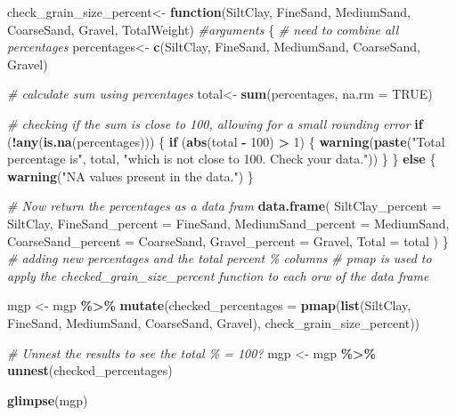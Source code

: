\documentclass[
]{article}
\newenvironment{Shaded}{\begin{snugshade}}{\end{snugshade}}
\newcommand{\AttributeTok}[1]{\textcolor[rgb]{0.13,0.29,0.53}{#1}}
\newcommand{\CommentTok}[1]{\textcolor[rgb]{0.56,0.35,0.01}{\textit{#1}}}
\newcommand{\ConstantTok}[1]{\textcolor[rgb]{0.56,0.35,0.01}{#1}}
\newcommand{\ControlFlowTok}[1]{\textcolor[rgb]{0.13,0.29,0.53}{\textbf{#1}}}
\newcommand{\DecValTok}[1]{\textcolor[rgb]{0.00,0.00,0.81}{#1}}
\newcommand{\FunctionTok}[1]{\textcolor[rgb]{0.13,0.29,0.53}{\textbf{#1}}}
\newcommand{\NormalTok}[1]{#1}
\newcommand{\OtherTok}[1]{\textcolor[rgb]{0.56,0.35,0.01}{#1}}
\newcommand{\SpecialCharTok}[1]{\textcolor[rgb]{0.81,0.36,0.00}{\textbf{#1}}}
\newcommand{\StringTok}[1]{\textcolor[rgb]{0.31,0.60,0.02}{#1}}
\begin{document}
\begin{Shaded}
\begin{Highlighting}[]
\NormalTok{check\_grain\_size\_percent}\OtherTok{\textless{}{-}} \ControlFlowTok{function}\NormalTok{(SiltClay, FineSand, MediumSand, CoarseSand, Gravel, TotalWeight) }\CommentTok{\#arguments }
\NormalTok{\{ }\CommentTok{\# need to combine all percentages}
\NormalTok{  percentages}\OtherTok{\textless{}{-}} \FunctionTok{c}\NormalTok{(SiltClay, FineSand, MediumSand, CoarseSand, Gravel)}
  
  \CommentTok{\# calculate sum using percentages}
\NormalTok{  total}\OtherTok{\textless{}{-}} \FunctionTok{sum}\NormalTok{(percentages, }\AttributeTok{na.rm =} \ConstantTok{TRUE}\NormalTok{)}
  
  \CommentTok{\# checking if the sum is close to 100, allowing for a small rounding error}
   \ControlFlowTok{if}\NormalTok{ (}\SpecialCharTok{!}\FunctionTok{any}\NormalTok{(}\FunctionTok{is.na}\NormalTok{(percentages))) \{}
    \ControlFlowTok{if}\NormalTok{ (}\FunctionTok{abs}\NormalTok{(total }\SpecialCharTok{{-}} \DecValTok{100}\NormalTok{) }\SpecialCharTok{\textgreater{}} \DecValTok{1}\NormalTok{) \{}
      \FunctionTok{warning}\NormalTok{(}\FunctionTok{paste}\NormalTok{(}\StringTok{"Total percentage is"}\NormalTok{, total, }\StringTok{"which is not close to 100. Check your data."}\NormalTok{))}
\NormalTok{    \}}
\NormalTok{  \} }\ControlFlowTok{else}\NormalTok{ \{}
    \FunctionTok{warning}\NormalTok{(}\StringTok{"NA values present in the data."}\NormalTok{)}
\NormalTok{  \}}
  
  \CommentTok{\# Now return the percentages as a data fram}
  \FunctionTok{data.frame}\NormalTok{(}
    \AttributeTok{SiltClay\_percent =}\NormalTok{ SiltClay,}
    \AttributeTok{FineSand\_percent =}\NormalTok{ FineSand,}
    \AttributeTok{MediumSand\_percent =}\NormalTok{ MediumSand,}
    \AttributeTok{CoarseSand\_percent =}\NormalTok{ CoarseSand,}
    \AttributeTok{Gravel\_percent =}\NormalTok{ Gravel,}
    \AttributeTok{Total =}\NormalTok{ total}
\NormalTok{  )}
\NormalTok{\}}
\CommentTok{\# adding new percentages and the total percent \% columns}
\CommentTok{\# pmap is used to apply the checked\_grain\_size\_percent function to each orw of the data frame}

\NormalTok{mgp }\OtherTok{\textless{}{-}}\NormalTok{ mgp }\SpecialCharTok{\%\textgreater{}\%}
  \FunctionTok{mutate}\NormalTok{(}\AttributeTok{checked\_percentages =} \FunctionTok{pmap}\NormalTok{(}\FunctionTok{list}\NormalTok{(SiltClay, FineSand, MediumSand, CoarseSand, Gravel),}
\NormalTok{                                    check\_grain\_size\_percent))}

\CommentTok{\# Unnest the results to see the total \% = 100?}
\NormalTok{mgp }\OtherTok{\textless{}{-}}\NormalTok{ mgp }\SpecialCharTok{\%\textgreater{}\%}
  \FunctionTok{unnest}\NormalTok{(checked\_percentages)}

\FunctionTok{glimpse}\NormalTok{(mgp)}
\end{Highlighting}
\end{Shaded}
\end{document}
